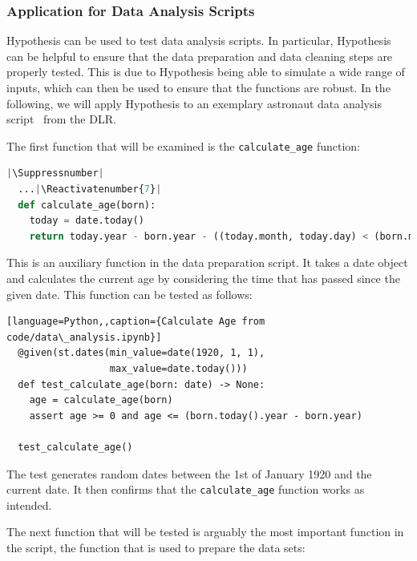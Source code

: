 \documentclass[runningheads]{llncs}
\makeatletter
\let\origthelstnumber\thelstnumber
\newcommand*\Suppressnumber{%
  \lst@AddToHook{OnNewLine}{%
    \let\thelstnumber\relax%
     \advance\c@lstnumber-\@ne\relax%
    }%
}
\newcommand*\Reactivatenumber[1]{%
  \setcounter{lstnumber}{\numexpr#1-1\relax}
  \lst@AddToHook{OnNewLine}{%
   \let\thelstnumber\origthelstnumber%
   \refstepcounter{lstnumber}%
  }%
}
\makeatother
\begin{document}
\subsubsection{Application for Data Analysis Scripts}
Hypothesis can be used to test data analysis scripts. In particular, Hypothesis can be helpful to ensure that the data preparation and data cleaning steps are properly tested. This is due to Hypothesis being able to simulate a wide range of inputs, which can then be used to ensure that the functions are robust. In the following, we will apply Hypothesis to an exemplary astronaut data analysis script~\cite{Stoffers2021} from the DLR.

\vspace{5mm}
\noindent The first function that will be examined is the \texttt{calculate\_age} function:

\begin{lstlisting}[language=Python,caption={Calculate Age from code/data\_analysis.ipynb}]
  |\Suppressnumber|
  ...|\Reactivatenumber{7}|
  def calculate_age(born):
    today = date.today()
    return today.year - born.year - ((today.month, today.day) < (born.month, born.day))
\end{lstlisting}
This is an auxiliary function in the data preparation script. It takes a date object and calculates the current age by considering the time that has passed since the given date. This function can be tested as follows:

\begin{lstlisting}[language=Python,,caption={Calculate Age from code/data\_analysis.ipynb}]
  @given(st.dates(min_value=date(1920, 1, 1), 
                  max_value=date.today()))
  def test_calculate_age(born: date) -> None:
    age = calculate_age(born)
    assert age >= 0 and age <= (born.today().year - born.year)
  
  test_calculate_age()
\end{lstlisting}
The test generates random dates between the 1st of January 1920 and the current date. It then confirms that the \texttt{calculate\_age} function works as intended.

\vspace{5mm}
\noindent The next function that will be tested is arguably the most important function in the script, the function that is used to prepare the data sets:
\end{document}
